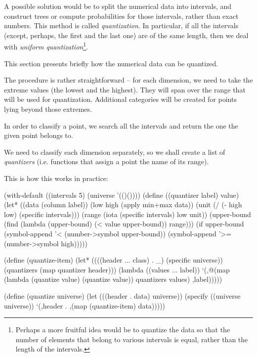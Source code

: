 A possible solution would be to split the numerical data
into intervals, and construct trees or compute probabilities
for those intervals, rather than exact numbers. This method
is called \textit{quantization}. In particular, if all 
the intervals (except, perhaps, the first and the last one)
are of the same length, then we deal with \textit{uniform
quantization}\footnote{Perhaps a more fruitful idea would
be to quantize the data so that the number of elements
that belong to various intervals is equal, rather than
the length of the intervals.}.

This section presents briefly how the numerical data
can be quantized.

The procedure is rather straightforward -- for each
dimension, we need to take the extreme values (the
lowest and the highest). They will span over the range
that will be used for quantization. Additional categories
will be created for points lying beyond those extremes.

In order to classify a point, we search all the intervals
and return the one the given point belongs to.

We need to classify each dimension separately, so we
shall create a list of \textit{quantizers} (i.e. functions
that assign a point the name of its range).

This is how this works in practice:

\begin{Snippet}
(with-default ((intervals 5)
	       (universe '(()())))
  (define ((quantizer label) value)
    (let* ((data (column label))
	   (low high (apply min+max data))
	   (unit (/ (- high low) (specific intervals)))
	   (range (iota (specific intervals) low unit))
	   (upper-bound (find (lambda (upper-bound)
				(< value upper-bound))
			      range)))
      (if upper-bound
	  (symbol-append '< (number->symbol upper-bound))
	  (symbol-append '>= (number->symbol high)))))

  (define (quantize-item)
    (let* ((((header ... class) . _) (specific universe))
	   (quantizers (map quantizer header)))
      (lambda ((values ... label))
	`(,@(map (lambda (quantize value) 
		   (quantize value))
		 quantizers values) ,label)))))
\end{Snippet}
\begin{Snippet}
(define (quantize universe)
  (let (((header . data) universe))
    (specify ((universe universe))
      `(,header . ,(map (quantize-item) data)))))
\end{Snippet}


